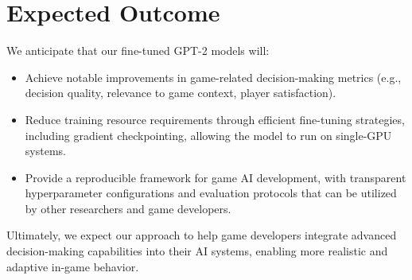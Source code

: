 \documentclass[11pt]{article}
\begin{document}
\section{Expected Outcome}
We anticipate that our fine-tuned GPT-2 models will:
\begin{itemize}
    \item Achieve notable improvements in game-related decision-making metrics (e.g., decision quality, relevance to game context, player satisfaction).
    \item Reduce training resource requirements through efficient fine-tuning strategies, including gradient checkpointing, allowing the model to run on single-GPU systems.
    \item Provide a reproducible framework for game AI development, with transparent hyperparameter configurations and evaluation protocols that can be utilized by other researchers and game developers.
\end{itemize}
Ultimately, we expect our approach to help game developers integrate advanced decision-making capabilities into their AI systems, enabling more realistic and adaptive in-game behavior.



\end{document}
